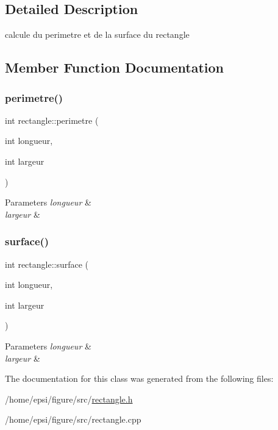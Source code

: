 \subsection{Detailed Description}
calcule du perimetre et de la surface du rectangle 

\subsection{Member Function Documentation}
\mbox{\label{classrectangle_aa613ad02ccb6dac181af4da6582315e6}} 
\subsubsection{\texorpdfstring{perimetre()}{perimetre()}}
{\footnotesize\ttfamily int rectangle\+::perimetre (\begin{DoxyParamCaption}\item[{int}]{longueur,  }\item[{int}]{largeur }\end{DoxyParamCaption})}


\begin{DoxyParams}{Parameters}
{\em longueur} & \\
\hline
{\em largeur} & \\
\hline
\end{DoxyParams}
\mbox{\label{classrectangle_a5923870fc20835f463cde0f64023b042}} 
\subsubsection{\texorpdfstring{surface()}{surface()}}
{\footnotesize\ttfamily int rectangle\+::surface (\begin{DoxyParamCaption}\item[{int}]{longueur,  }\item[{int}]{largeur }\end{DoxyParamCaption})}


\begin{DoxyParams}{Parameters}
{\em longueur} & \\
\hline
{\em largeur} & \\
\hline
\end{DoxyParams}


The documentation for this class was generated from the following files\+:\begin{DoxyCompactItemize}
\item 
/home/epsi/figure/src/\hyperlink{rectangle_8h}{rectangle.\+h}\item 
/home/epsi/figure/src/rectangle.\+cpp\end{DoxyCompactItemize}
